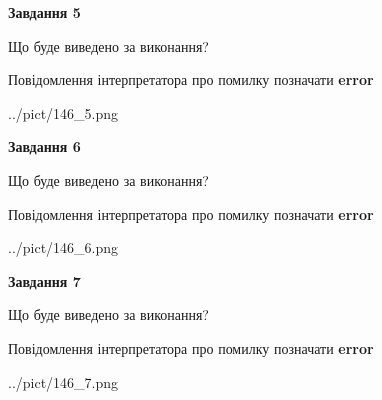 \documentclass[10pt, ukrainian]{article}
\begin{document}
{\begin {large}
{\begin {center}\textbf{Завдання 5}\end {center}}\par
Що буде виведено за виконання? \par
Повідомлення інтерпретатора про помилку позначати \textbf{error}

\begin{center}
	{../pict/146_5.png}
\end{center}
\newpage

{\begin {center}\textbf{Завдання 6}\end {center}}\par
Що буде виведено за виконання? \par
Повідомлення інтерпретатора про помилку позначати \textbf{error}

\begin{center}
	{../pict/146_6.png}
\end{center}
\newpage

{\begin {center}\textbf{Завдання 7}\end {center}}\par
Що буде виведено за виконання? \par
Повідомлення інтерпретатора про помилку позначати \textbf{error}

\begin{center}
	{../pict/146_7.png}
\end{center}
\newpage

\end {large}}
\end{document}
